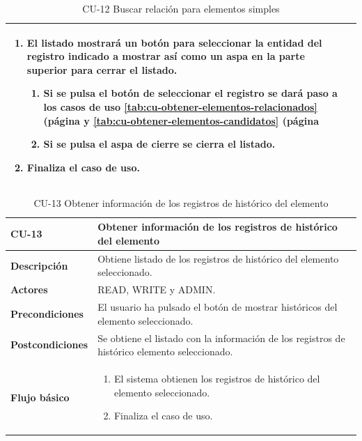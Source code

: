 \begin{table} [H]
{\begin{tabular}{| m{3cm} | m{12cm} |}
\begin{enumerate}
		\item El listado mostrará un botón para seleccionar la entidad del registro indicado a mostrar así como un aspa en la parte superior para cerrar el listado.
		       \begin{enumerate}	
			        \item Si se pulsa el botón de seleccionar el registro se dará paso a los casos de uso \ref{tab:cu-obtener-elementos-relacionados} (página \pageref{tab:cu-obtener-elementos-relacionados} y \ref{tab:cu-obtener-elementos-candidatos} (página \pageref{tab:cu-obtener-elementos-candidatos}
			        \item Si se pulsa el aspa de cierre se cierra el listado.
			\end{enumerate}
		\item Finaliza el caso de uso.				
	  \end{enumerate} 	  	  
	  \\\hline
    \end{tabular}
    } %
    \caption{CU-12 Buscar relación para elementos simples}
    \label{tab:cu-buscar-relacion-elementos-historico}
\end{table}




\begin{table} [H]
    \centering
    \setlength{\leftmargini}{0.4cm}
	\resizebox{15cm}{!} { %
    \begin{tabular}{| m{3cm} | m{12cm} |}   
    \hline
	  \textbf{CU-13} & \textbf{Obtener información de los registros de histórico del elemento} \\\hline
	  \textbf{Descripción} & Obtiene listado de los registros de histórico del elemento seleccionado. \\\hline
	  \textbf{Actores} & READ, WRITE y ADMIN. \\\hline
	  \textbf{Precondiciones} & El usuario ha pulsado el botón de mostrar históricos del elemento seleccionado. \\\hline
	  \textbf{Postcondiciones} & Se obtiene el listado con la información de los registros de histórico elemento seleccionado. \\\hline
	  \textbf{Flujo básico} & 
		\begin{enumerate}
	  	\item El sistema obtienen los registros de histórico del elemento seleccionado.
		\item Finaliza el caso de uso.				
	  \end{enumerate} 	  	  
	  \\\hline
    \end{tabular}
    } %
    \caption{CU-13 Obtener información de los registros de histórico del elemento}
    \label{tab:cu-obtener-historicos}
\end{table}


